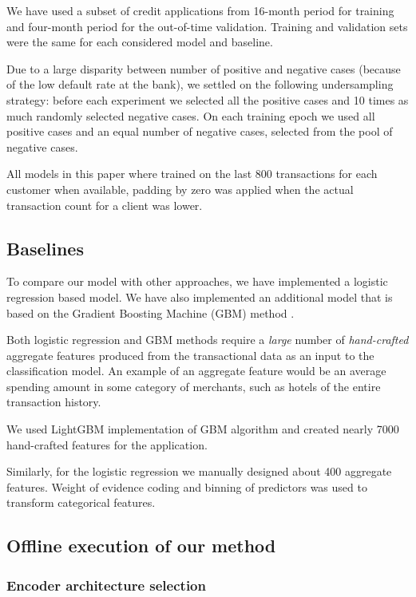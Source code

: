 \documentclass[sigconf]{acmart}
\begin{document}
We have used a subset of credit applications from 16-month period for training and four-month period for the out-of-time validation. Training and validation sets were the same for each considered model and baseline.

Due to a large disparity between number of positive and negative cases (because of the low default rate at the bank), we settled on the following undersampling strategy: before each experiment we selected all the positive cases and 10 times as much randomly selected negative cases. On each training epoch we used all positive cases and an equal number of negative cases, selected from the pool of negative cases.

All models in this paper where trained on the last 800 transactions for each customer when available, padding by zero was applied when the actual transaction count for a client was lower.

\subsection{Baselines}

To compare our model with other approaches, we have implemented a logistic regression based model. We have also implemented an additional model that is based on the Gradient Boosting Machine (GBM) method \cite{friedman2001greedy}.

Both logistic regression and GBM methods require a \textit{large} number of \textit{hand-crafted} aggregate features produced from the transactional data as an input to the classification model. An example of an aggregate feature would be an average spending amount in some category of merchants, such as hotels of the entire transaction history.

We used LightGBM\cite{Ke2017LightGBMAH} implementation of GBM algorithm and created nearly 7000 hand-crafted features for the application.

Similarly, for the logistic regression we manually designed about 400 aggregate features. Weight of evidence coding and binning of predictors \cite{lund2016woe} was used to transform categorical features.

\subsection{Offline execution of our method} \label{sec-exec}

\subsubsection{Encoder architecture selection} \label{sec-arc-sel}
\end{document}
